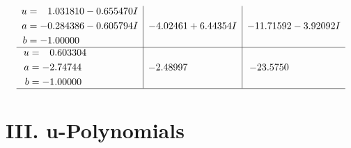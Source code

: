 \documentclass[1p]{elsarticle_modified}
\theoremstyle{definition}
\begin{document}
$$\begin{array}{c|c|c}
\begin{aligned}
u &= \phantom{-}1.031810 - 0.655470 I \\
a &= -0.284386 - 0.605794 I \\
b &= -1.00000\phantom{ +0.000000I}\end{aligned}
 & -4.02461 + 6.44354 I & -11.71592 - 3.92092 I \\ \hline\begin{aligned}
u &= \phantom{-}0.603304\phantom{ +0.000000I} \\
a &= -2.74744\phantom{ +0.000000I} \\
b &= -1.00000\phantom{ +0.000000I}\end{aligned}
 & -2.48997\phantom{ +0.000000I} & -23.5750\phantom{ +0.000000I}\\
 \hline 
 \end{array}$$\newpage
\newpage\renewcommand{\arraystretch}{1}
\centering \section*{ III. u-Polynomials}
\end{document}
